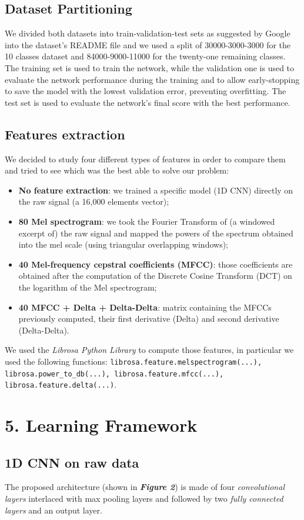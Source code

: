 \documentclass[conference]{IEEEtran}
\begin{document}
\subsection{Dataset Partitioning}
We divided both datasets into train-validation-test sets as suggested by Google into the dataset’s README file and we used a split of 30000-3000-3000 for the 10 classes dataset and 84000-9000-11000 for the twenty-one remaining classes. The training set is used to train the network, while the validation one is used to evaluate the network performance during the training and to allow early-stopping to save the model with the lowest validation error, preventing overfitting. The test set is used to evaluate the network’s final score with the best performance.

\subsection{Features extraction}
We decided to study four different types of features in order to compare them and tried to see which was the best able to solve our problem:
\begin{itemize}
\item \textbf{No feature extraction}: we trained a specific model (1D CNN) directly on the raw signal (a 16,000 elements vector);
\item \textbf{80 Mel spectrogram}: we took the Fourier Transform of (a windowed excerpt of) the raw signal and mapped the powers of the spectrum obtained into the mel scale (using triangular overlapping windows);
\item \textbf{40 Mel-frequency cepstral coefficients (MFCC)}: those coefficients are obtained after the computation of the Discrete Cosine Transform (DCT) on the logarithm of the Mel spectrogram;
\item \textbf{40 MFCC + Delta + Delta-Delta}: matrix containing the MFCCs previously computed, their first derivative (Delta) and second derivative (Delta-Delta).
\end{itemize}
We used the \textit{Librosa Python Library} to compute those features, in particular we used the following functions: \texttt{librosa.feature.melspectrogram(...), librosa.power\_to\_db(...), librosa.feature.mfcc(...), librosa.feature.delta(...)}.

\section{5.	Learning Framework}
\subsection{1D CNN on raw data}
The proposed architecture (shown in \textbf{\textit{Figure 2}}) is made of four \textit{convolutional layers} interlaced with max pooling layers and followed by two \textit{fully connected layers} and an output layer.
\end{document}
